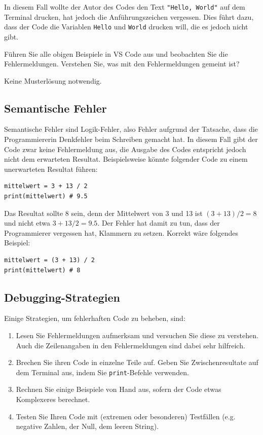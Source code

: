 In diesem Fall wollte der Autor des Codes den Text \lstinline|"Hello, World"| auf dem Terminal drucken, hat jedoch die Anführungszeichen vergessen. Dies führt dazu, dass der Code die Variablen \texttt{Hello} und \texttt{World} drucken will, die es jedoch nicht gibt.

\begin{myexercise}
	Führen Sie alle obigen Beispiele in VS Code aus und beobachten Sie die Fehlermeldungen. Verstehen Sie, was mit den Fehlermeldungen gemeint ist?
	\begin{myanswer}
		Keine Musterlösung notwendig.
	\end{myanswer}
\end{myexercise}


\subsection{Semantische Fehler}
\label{subsec:semantische-fehler}
Semantische Fehler sind Logik-Fehler, also Fehler aufgrund der Tatsache, dass die Programmiererin Denkfehler beim Schreiben gemacht hat. In diesem Fall gibt der Code zwar keine Fehlermeldung aus, die Ausgabe des Codes entspricht jedoch nicht dem erwarteten Resultat. Beispielsweise könnte folgender Code zu einem unerwarteten Resultat führen:

\begin{lstlisting}
mittelwert = 3 + 13 / 2
print(mittelwert) # 9.5
\end{lstlisting}
Das Resultat sollte 8 sein, denn der Mittelwert von 3 und 13 ist $(3 + 13) / 2 = 8$ und nicht etwa $3 + 13 / 2 = 9.5$. Der Fehler hat damit zu tun, dass der Programmierer vergessen hat, Klammern zu setzen. Korrekt wäre folgendes Beispiel:
\begin{lstlisting}
mittelwert = (3 + 13) / 2
print(mittelwert) # 8
\end{lstlisting}

\subsection{Debugging-Strategien}
Einige Strategien, um fehlerhaften Code zu beheben, sind:
\begin{enumerate}
	\item Lesen Sie Fehlermeldungen aufmerksam und versuchen Sie diese zu verstehen. Auch die Zeilenangaben in den Fehlermeldungen sind dabei sehr hilfreich.
	\item Brechen Sie ihren Code in einzelne Teile auf. Geben Sie Zwischenresultate auf dem Terminal aus, indem Sie \lstinline|print|-Befehle verwenden.
	\item Rechnen Sie einige Beispiele von Hand aus, sofern der Code etwas Komplexeres berechnet.
	\item Testen Sie Ihren Code mit (extremen oder besonderen) Testfällen (e.g. negative Zahlen, der Null, dem leeren String).
\end{enumerate}

